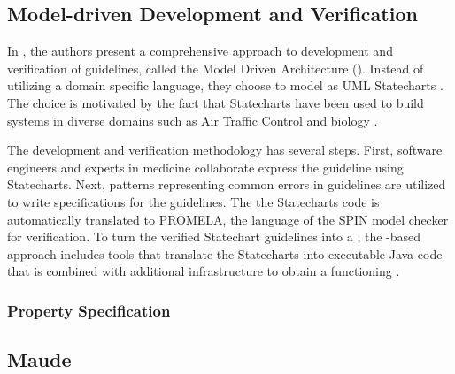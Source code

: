 \subsection{Model-driven Development and Verification}

In \cite{PerezJBI10}, the authors present a comprehensive approach
to development and verification of guidelines, called the Model Driven
Architecture (\MDA{}). Instead of
utilizing a domain specific language, they choose to model \BPGs{}
as UML Statecharts \cite{OMGSpecUrl}. The choice is motivated by
the fact that Statecharts have been used to build systems in diverse
domains such as Air Traffic Control \cite{WhittleICSE02} and biology
\cite{EfroniGR03}.

The development and verification methodology has several steps.
First, software engineers and experts in medicine collaborate
express the guideline using Statecharts. Next, patterns
representing common errors in guidelines are utilized to
write specifications for the guidelines. The
the Statecharts code is automatically translated to PROMELA,
the language of the SPIN model checker \cite{MikkISFST98} for verification.
To turn the verified Statechart guidelines into a \CDSS{}, the
\MDA{}-based approach includes tools that translate the Statecharts into
executable Java code that is combined with additional infrastructure to
obtain a functioning \CDSS{}.

\subsubsection{Property Specification}




\subsection{Maude}

